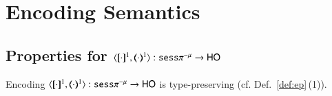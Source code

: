 \section{Encoding Semantics}



\subsection{Properties for $\encod{\cdot}{\cdot}{1}: \sespnr \to \HO$}

\begin{proposition}\rm
	\label{app:enc_sesspnr_to_ho_typing}
	Encoding $\encod{\cdot}{\cdot}{1}: \sespnr \to \HO$  is type-preserving (cf. Def.~\ref{def:ep}\,(1)).\rm
\end{proposition}

